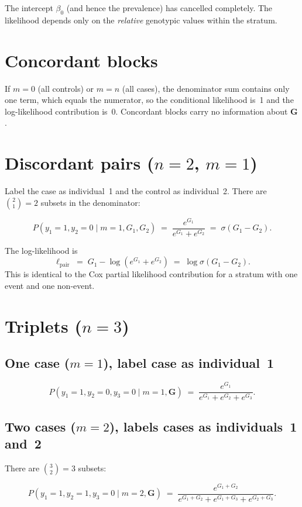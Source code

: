\documentclass[12pt]{article}
\begin{document}
The intercept $\beta_0$ (and hence the prevalence) has cancelled completely.
The likelihood depends only on the \emph{relative} genotypic values within the
stratum.

\section*{Concordant blocks}

If $m = 0$ (all controls) or $m = n$ (all cases), the denominator sum contains
only one term, which equals the numerator, so the conditional likelihood is~1
and the log-likelihood contribution is~0.  Concordant blocks carry no
information about $\bm{G}$.

\section*{Discordant pairs ($n = 2$, $m = 1$)}

Label the case as individual~1 and the control as individual~2.  There are
$\binom{2}{1} = 2$ subsets in the denominator:

\[
  P(y_1=1, y_2=0 \mid m=1, G_1, G_2)
  \;=\;
  \frac{e^{G_1}}{e^{G_1}+e^{G_2}}
  \;=\;
  \sigma(G_1 - G_2).
\]

The log-likelihood is
\[
  \ell_{\text{pair}} \;=\; G_1 - \log\!\left(e^{G_1}+e^{G_2}\right)
  \;=\; \log\sigma(G_1-G_2).
\]
This is identical to the Cox partial likelihood contribution for a stratum with
one event and one non-event.

\section*{Triplets ($n = 3$)}

\subsection*{One case ($m = 1$), label case as individual~1}

\[
  P(y_1=1, y_2=0, y_3=0 \mid m=1, \bm{G})
  \;=\;
  \frac{e^{G_1}}{e^{G_1}+e^{G_2}+e^{G_3}}.
\]

\subsection*{Two cases ($m = 2$), labels cases as individuals~1 and~2}

There are $\binom{3}{2} = 3$ subsets:

\[
  P(y_1=1,y_2=1,y_3=0 \mid m=2, \bm{G})
  \;=\;
  \frac{e^{G_1+G_2}}
       {e^{G_1+G_2}+e^{G_1+G_3}+e^{G_2+G_3}}.
\]
\end{document}
